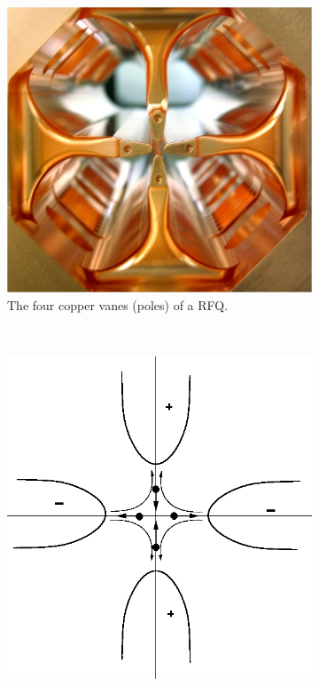 \begin{figure}[!ht]
  \centering
  \begin{subfigure}[t]{0.3\textwidth}
    \includegraphics[width=\textwidth]{02_BeamDiag/figures/fig000_RFQ_c}
    \caption[The four copper vanes of a RFQ]{The four copper vanes (poles) of a RFQ.}
    \label{chap2:fig:RFQ_c}
  \end{subfigure}
  ~
  \begin{subfigure}[t]{.3\textwidth}
    \includegraphics[width=\textwidth]{02_BeamDiag/figures/fig000_RFQ_a}

\end{subfigure}
\end{figure}
